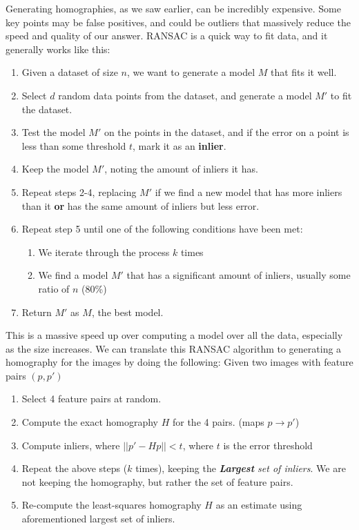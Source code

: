\documentclass{article}
\begin{document}
Generating homographies, as we saw earlier, can be incredibly expensive. Some key points may be false positives, and could be outliers that massively reduce the speed and quality of our answer. RANSAC is a quick way to fit data, and it generally works like this:
\begin{enumerate}
    \item Given a dataset of size $n$, we want to generate a model $M$ that fits it well.
    \item Select $d$ random data points from the dataset, and generate a model $M'$ to fit the dataset. 
    \item Test the model $M'$ on the points in the dataset, and if the error on a point is less than some threshold $t$, mark it as an \textbf{inlier}.
    \item Keep the model $M'$, noting the amount of inliers it has. 
    \item Repeat steps 2-4, replacing $M'$ if we find a new model that has more inliers than it \textbf{or} has the same amount of inliers but less error.
    \item Repeat step 5 until one of the following conditions have been met:
    \begin{enumerate}
        \item We iterate through the process $k$ times
        \item We find a model $M'$ that has a significant amount of inliers, usually some ratio of $n$ (80\%)
    \end{enumerate}
    \item Return $M'$ as $M$, the best model.
\end{enumerate}
This is a massive speed up over computing a model over all the data, especially as the size increases. We can translate this RANSAC algorithm to generating a homography for the images by doing the following: Given two images with feature pairs $(p,p')$
\newline
\begin{enumerate}
    \item Select 4 feature pairs at random.
    \item Compute the exact homography $H$ for the 4 pairs. (maps $p \rightarrow p'$)
    \item Compute inliers, where $||p' - Hp|| < t$, where $t$ is the error threshold
    \item Repeat the above steps ($k$ times), keeping the \textit{\textbf{Largest} set of inliers}. We are not keeping the homography, but rather the set of feature pairs.
    \item Re-compute the least-squares homography $H$ as an estimate using aforementioned largest set of inliers.
\end{enumerate}
\end{document}
